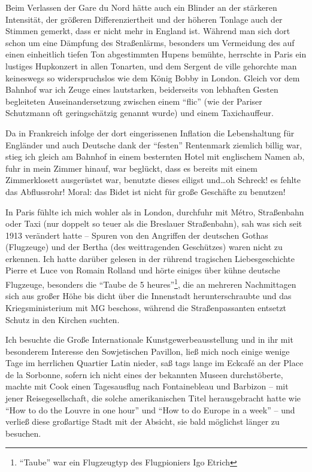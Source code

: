 \documentclass[a5paper,pagesize,10pt,twoside=true]{scrbook}
\renewcommand{\marginpar}[2][]{}
\begin{document}
Beim Verlassen der Gare du Nord hätte auch ein Blinder an der stärkeren Intensität, der größeren Differenziertheit und der höheren Tonlage auch der Stimmen gemerkt, dass er nicht mehr in England ist. Während man sich dort schon um eine Dämpfung des Straßenlärms, besonders um Vermeidung des auf einen einheitlich tiefen Ton abgestimmten Hupens bemühte, herrschte in Paris ein lustiges Hupkonzert in allen Tonarten, und dem Sergent de ville gehorchte man keineswegs so widerspruchslos wie dem König Bobby in London. Gleich vor dem Bahnhof war ich Zeuge eines lautstarken, beiderseits von lebhaften Gesten begleiteten Auseinandersetzung zwischen einem \enquote{flic} (wie der Pariser Schutzmann oft geringschätzig genannt wurde) und einem Taxichauffeur.

Da in Frankreich infolge der dort eingerissenen Inflation die Lebenshaltung für Engländer und auch Deutsche dank der \enquote{festen} Rentenmark ziemlich billig war, stieg ich gleich am Bahnhof in einem besternten Hotel mit englischem Namen ab, fuhr in mein Zimmer hinauf, war beglückt, dass es bereits mit einem Zimmerklosett ausgerüstet war, benutzte dieses eiligst und\dots oh Schreck! es fehlte das Abflussrohr! Moral: das Bidet ist nicht für große Geschäfte zu benutzen!

In Paris fühlte ich mich wohler als in London, durchfuhr mit Métro, Straßenbahn oder Taxi (nur doppelt so teuer als die Breslauer Straßenbahn), sah was sich seit 1913 verändert hatte -- Spuren von den Angriffen der deutschen Gothas (Flugzeuge) und der Bertha (des weittragenden Geschützes) waren nicht zu erkennen. Ich hatte darüber gelesen in der rührend tragischen Liebesgeschichte Pierre et Luce von Romain Rolland und hörte einiges über kühne deutsche Flugzeuge, besonders die \enquote{Taube de 5 heures}\footnote{\enquote{Taube} war ein Flugzeugtyp des Flugpioniers Igo Etrich}, die an mehreren Nachmittagen sich aus großer Höhe bis dicht über die Innenstadt herunterschraubte und das Kriegsministerium mit MG beschoss, während die Straßenpassanten entsetzt Schutz in den Kirchen suchten.

\marginpar{524}
Ich besuchte die Große Internationale Kunstgewerbeausstellung und in ihr mit besonderem Interesse den Sowjetischen Pavillon, ließ mich noch einige wenige Tage im herrlichen Quartier Latin nieder, saß tags lange im Eckcafé an der Place de la Sorbonne, sofern ich nicht eines der bekannten Museen durchstöberte, machte mit Cook einen Tagesausflug nach Fontainebleau und Barbizon -- mit jener Reisegesellschaft, die solche amerikanischen Titel herausgebracht hatte wie \enquote{How to do the Louvre in one hour} und \enquote{How to do Europe in a week} -- und verließ diese großartige Stadt mit der Absicht, sie bald möglichst länger zu besuchen.
\end{document}
